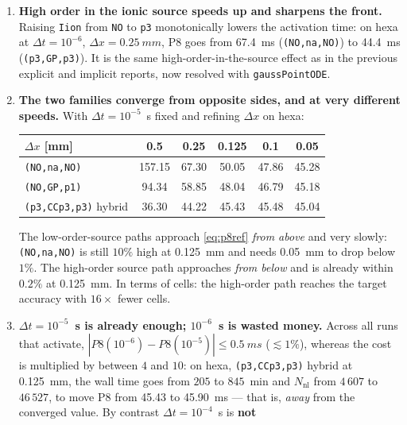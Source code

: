 \documentclass[11pt,a4paper]{article}
\newcommand{\code}[1]{\texttt{\small #1}}
\begin{document}
\begin{enumerate}[topsep=3pt,itemsep=3pt,leftmargin=1.5em]
  \item \textbf{High order in the ionic source speeds up and sharpens the front.} Raising
        \code{Iion} from \code{NO} to \code{p3} monotonically lowers the activation
        time: on hexa at $\Delta t=10^{-6}$, $\Delta x=\SI{0.25}{mm}$, P8 goes
        from \SI{67.4}{ms} (\code{(NO,na,NO)}) to \SI{44.4}{ms} (\code{(p3,GP,p3)}). It is
        the same high-order-in-the-source effect as in the previous explicit and implicit
        reports, now resolved with \code{gaussPointODE}.
  \item \textbf{The two families converge from opposite sides, and at very
        different speeds.} With $\Delta t=10^{-5}$~s fixed and refining $\Delta x$ on hexa:
        \begin{center}\footnotesize
        \begin{tabular}{lccccc}
        \toprule
        $\Delta x$ [mm] & 0.5 & 0.25 & 0.125 & 0.1 & 0.05\\
        \midrule
        \code{(NO,na,NO)}            & 157.15 & 67.30 & 50.05 & 47.86 & 45.28\\
        \code{(NO,GP,p1)}            & 94.34  & 58.85 & 48.04 & 46.79 & 45.18\\
        \code{(p3,CCp3,p3)} hybrid   & 36.30  & 44.22 & 45.43 & 45.48 & 45.04\\
        \bottomrule
        \end{tabular}
        \end{center}
        The low-order-source paths approach \eqref{eq:p8ref}
        \emph{from above} and very slowly: \code{(NO,na,NO)} is still $10\%$ high
        at \SI{0.125}{mm} and needs \SI{0.05}{mm} to drop below $1\%$. The high-order
        source path approaches \emph{from below} and is already within
        $0.2\%$ at \SI{0.125}{mm}. In terms of cells: the high-order path
        reaches the target accuracy with $16\times$ fewer cells.
  \item \textbf{$\Delta t=10^{-5}$~s is already enough; $10^{-6}$~s is wasted money.}
        Across all runs that activate, $|P8(10^{-6})-P8(10^{-5})|\le
        \SI{0.5}{ms}$ ($\lesssim 1\%$), whereas the cost is multiplied by
        between $4$ and $10$: on hexa, \code{(p3,CCp3,p3)} hybrid at \SI{0.125}{mm}, the
        wall time goes from $205$ to $845$~min and $N_{\mathrm{nl}}$ from $4\,607$ to $46\,527$,
        to move P8 from \SI{45.43}{} to \SI{45.90}{ms} --- that is, \emph{away}
        from the converged value. By contrast $\Delta t=10^{-4}$~s is \textbf{not}

\end{enumerate}
\end{document}
